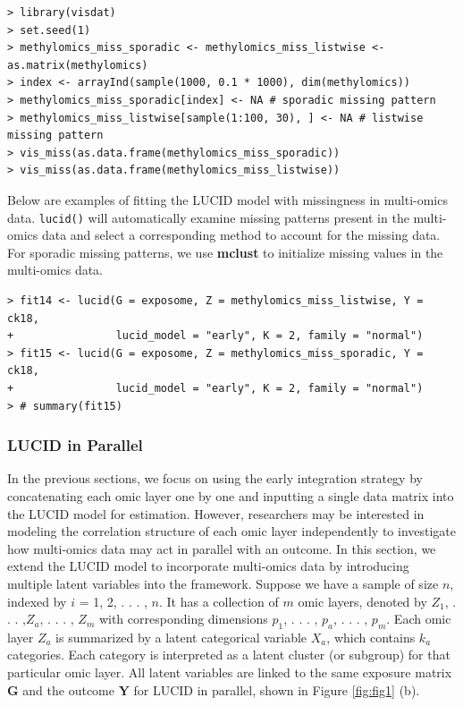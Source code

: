 \begin{verbatim}
> library(visdat)
> set.seed(1)
> methylomics_miss_sporadic <- methylomics_miss_listwise <- as.matrix(methylomics)
> index <- arrayInd(sample(1000, 0.1 * 1000), dim(methylomics))
> methylomics_miss_sporadic[index] <- NA # sporadic missing pattern
> methylomics_miss_listwise[sample(1:100, 30), ] <- NA # listwise missing pattern
> vis_miss(as.data.frame(methylomics_miss_sporadic))
> vis_miss(as.data.frame(methylomics_miss_listwise))
\end{verbatim}

Below are examples of fitting the LUCID model with missingness in
multi-omics data. \texttt{lucid()} will automatically examine missing patterns
present in the multi-omics data and select a corresponding method to
account for the missing data. For sporadic missing patterns, we use
\textbf{mclust} to initialize missing values in the multi-omics data.

\begin{verbatim}
> fit14 <- lucid(G = exposome, Z = methylomics_miss_listwise, Y = ck18, 
+                lucid_model = "early", K = 2, family = "normal")
> fit15 <- lucid(G = exposome, Z = methylomics_miss_sporadic, Y = ck18, 
+                lucid_model = "early", K = 2, family = "normal")
> # summary(fit15)
\end{verbatim}

\subsubsection{LUCID in Parallel}\label{sec_parallel}

In the previous sections, we focus on using the early integration
strategy by concatenating each omic layer one by one and inputting a
single data matrix into the LUCID model for estimation. However,
researchers may be interested in modeling the correlation structure of
each omic layer independently to investigate how multi-omics data may
act in parallel with an outcome. In this section, we extend the LUCID
model to incorporate multi-omics data by introducing multiple latent
variables into the framework. Suppose we have a sample of size \(n\),
indexed by \(i\) = 1, 2, . . . , \(n\). It has a collection of \(m\) omic
layers, denoted by \(Z_1\), . . . ,\(Z_a\), . . . , \(Z_m\) with corresponding
dimensions \(p_1\), . . . , \(p_a\), . . . , \(p_m\). Each omic layer \(Z_a\) is
summarized by a latent categorical variable \(X_a\), which contains \(k_a\)
categories. Each category is interpreted as a latent cluster (or
subgroup) for that particular omic layer. All latent variables are
linked to the same exposure matrix \(\boldsymbol{\mathbf{G}}\) and the
outcome \(\boldsymbol{\mathbf{Y}}\) for LUCID in parallel, shown in Figure
\ref{fig:fig1} (b).

